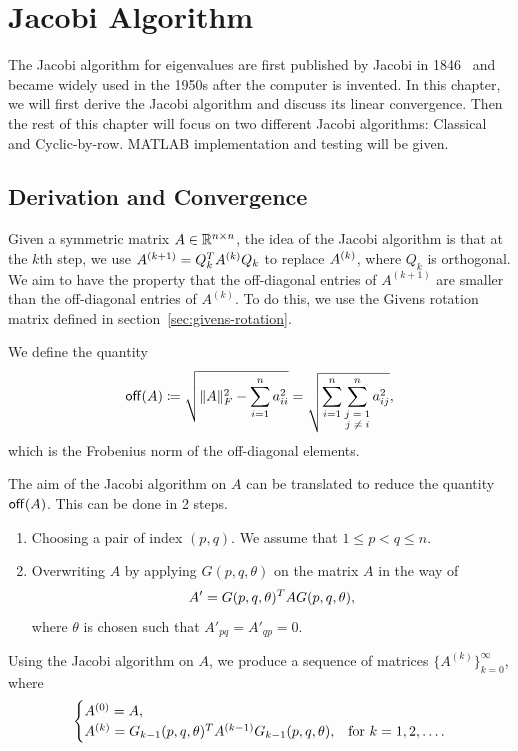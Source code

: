 \chapter{Jacobi Algorithm}\label{chap:jacobi_algorithm}

The Jacobi algorithm for eigenvalues are first published by Jacobi in 1846~\cite{Jacobi-original-paper-1846} and became widely used in the 1950s after the computer is invented. In this chapter, we will first derive the Jacobi algorithm and discuss its linear convergence. Then the rest of this chapter will focus on two different Jacobi algorithms: Classical and Cyclic-by-row. MATLAB implementation and testing will be given.


\section{Derivation and Convergence}\label{sec:Deriv and Conver}

Given a symmetric matrix $A\in \mathbb{R}^{n\times n}$, the idea of the Jacobi algorithm is that at the $k$th step, we use $A^{(k+1)} = Q_{k}^T A^{(k)}Q_{k}$ to replace $A^{(k)}$, where $Q_{k}$ is orthogonal. We aim to have the property that the off-diagonal entries of $A^{(k+1)}$ are smaller than the off-diagonal entries of $A^{(k)}$. To do this, we use the Givens rotation matrix defined in section~\ref{sec:givens-rotation}.

\begin{definition}
  We define the quantity
  \begin{equation}\notag
      \mathsf{off}(A) \coloneqq \sqrt{\|A\|^2_F - \sum_{i=1}^n a^2_{ii}} = \sqrt{\sum_{i=1}^n \sum_{\substack{\text{$j=1$}\\\text{$j\neq i$}}}^n a^2_{ij}},
  \end{equation}
  which is the Frobenius norm of the off-diagonal elements.
\end{definition}

The aim of the Jacobi algorithm on $A$ can be translated to reduce the quantity $\mathsf{off}(A)$. This can be done in 2 steps. 
\begin{enumerate}
  \item Choosing a pair of index $(p,q)$. We assume that $1\leq p < q\leq n$.
  \item Overwriting $A$ by applying $G(p,q,\theta)$ on the matrix $A$ in the way of $$A' = G(p,q,\theta)^T AG(p,q,\theta),$$ where $\theta$ is chosen such that $A'_{pq}= A'_{qp} = 0$.
\end{enumerate}
Using the Jacobi algorithm on $A$, we produce a sequence of matrices $\big\{A^{(k)}\big\}_{k=0}^\infty$, where 
\begin{equation}\notag
  \begin{cases}
      A^{(0)} = A,  \\
      A^{(k)} = G_{k-1}(p,q,\theta)^T A^{(k-1)}G_{k-1}(p,q,\theta), & \text{for $k = 1,2,\dots$.}
  \end{cases}
\end{equation}

